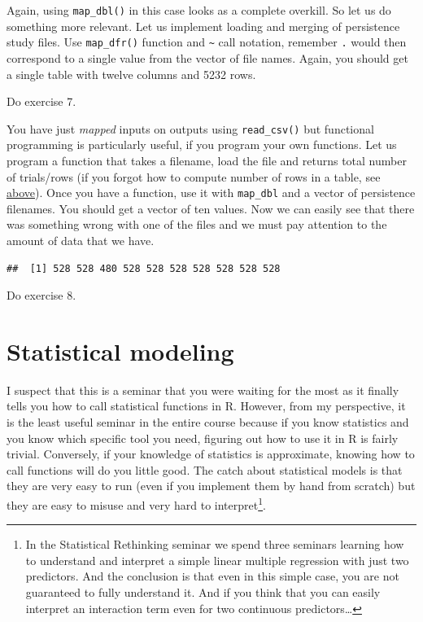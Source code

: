 \documentclass[
]{book}
\begin{document}
Again, using \texttt{map\_dbl()} in this case looks as a complete overkill. So let us do something more relevant. Let us implement loading and merging of persistence study files. Use \texttt{map\_dfr()} function and \texttt{\textasciitilde{}} call notation, remember \texttt{.} would then correspond to a single value from the vector of file names. Again, you should get a single table with twelve columns and 5232 rows.

Do exercise 7.

You have just \emph{mapped} inputs on outputs using \texttt{read\_csv()} but functional programming is particularly useful, if you program your own functions. Let us program a function that takes a filename, load the file and returns total number of trials/rows (if you forgot how to compute number of rows in a table, see \protect\hyperlink{forloop}{above}). Once you have a function, use it with \texttt{map\_dbl} and a vector of persistence filenames. You should get a vector of ten values. Now we can easily see that there was something wrong with one of the files and we must pay attention to the amount of data that we have.

\begin{verbatim}
##  [1] 528 528 480 528 528 528 528 528 528 528
\end{verbatim}

Do exercise 8.

\hypertarget{seminar10}{%
\chapter{Statistical modeling}\label{seminar10}}

I suspect that this is a seminar that you were waiting for the most as it finally tells you how to call statistical functions in R. However, from my perspective, it is the least useful seminar in the entire course because if you know statistics and you know which specific tool you need, figuring out how to use it in R is fairly trivial. Conversely, if your knowledge of statistics is approximate, knowing how to call functions will do you little good. The catch about statistical models is that they are very easy to run (even if you implement them by hand from scratch) but they are easy to misuse and very hard to interpret\footnote{In the Statistical Rethinking seminar we spend three seminars learning how to understand and interpret a simple linear multiple regression with just two predictors. And the conclusion is that even in this simple case, you are not guaranteed to fully understand it. And if you think that you can easily interpret an interaction term even for two continuous predictors\ldots{}}.
\end{document}
